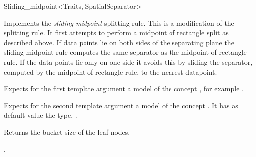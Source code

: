 

\begin{ccRefFunctionObjectClass}{Sliding_midpoint<Traits, SpatialSeparator>}


\ccDefinition
Implements the {\em sliding midpoint} splitting rule.
This is a modification of the  splitting rule.
It first attempts to perform a midpoint of rectangle split as
described above. If data points lie on both sides of the separating
plane the sliding midpoint rule computes the same separator as
the midpoint of rectangle rule. If the data points lie only on one
side it avoids this by sliding the separator, computed by
the midpoint of rectangle rule, to the nearest datapoint.


\ccParameters

Expects for the first template argument a model of the concept
, for example .

Expects for the second template argument a model of the concept . It has as default value
the type, .


\ccIsModel


\ccCreation
{}  %


\ccOperations

 {Returns the bucket size of the leaf nodes.}


\ccSeeAlso

,\\
\end{ccRefFunctionObjectClass}


